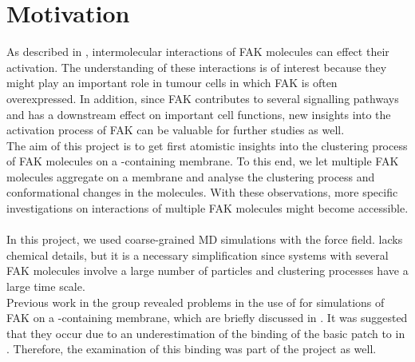 \chapter{Motivation}
As described in , intermolecular interactions of FAK molecules can effect their activation. The understanding of these interactions is of interest because they might play an important role in tumour cells in which FAK is often overexpressed. In addition, since FAK contributes to several signalling pathways and has a downstream effect on important cell functions, new insights into the activation process of FAK can be valuable for further studies as well.\\
The aim of this project is to get first atomistic insights into the clustering process of FAK molecules on a \pip{}-containing membrane. To this end, we let multiple FAK molecules aggregate on a membrane and analyse the clustering process and conformational changes in the molecules. With these observations, more specific investigations on interactions of multiple FAK molecules might become accessible.\\
\\
In this project, we used coarse-grained MD simulations with the \martini{} force field. \martini{} lacks chemical details, but it is a necessary simplification since systems with several FAK molecules involve a large number of particles and clustering processes have a large time scale.\\
Previous work in the group revealed problems in the use of \martini{} for simulations of FAK on a \pip{}-containing membrane, which are briefly discussed in . It was suggested that they occur due to an underestimation of the binding of the basic patch to \pip{} in \martini{}. Therefore, the examination of this binding was part of the project as well.
